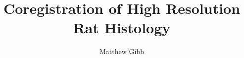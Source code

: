 \documentclass[journal,twocolumn,a4paper,10pt]{../Setup/IEEEtran}
\begin{document}
\def\rootpath{..}
\def\localpath{.}
  
\title{Coregistration of High Resolution Rat Histology}
\author{Matthew Gibb}
%
\maketitle
 
\begin{abstract}

\end{abstract}





 

 
\end{document}
